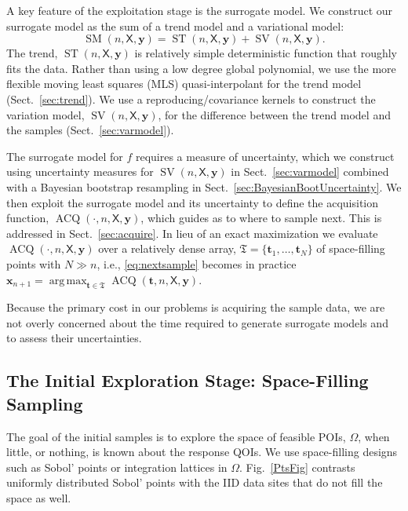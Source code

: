 \documentclass[11pt]{NSFamsart}
\DeclareMathOperator*{\argmax}{arg\,max}
\DeclareMathOperator{\SURR}{SM} %
\DeclareMathOperator{\STREND}{ST} %
\DeclareMathOperator{\SVAR}{SV} %
\DeclareMathOperator{\VAL}{ACQ}
\newcommand{\mX}{\mathsf{X}}
\newcommand{\bx}{{\boldsymbol{x}}}
\newcommand{\by}{{\boldsymbol{y}}}
\newcommand{\bt}{{\boldsymbol{t}}}
\newcommand{\ct}{\mathfrak{T}}
\begin{document}
A key feature of the exploitation stage is the surrogate model. We construct our surrogate model as the sum of a trend model and a variational model: 
\begin{equation*}
\SURR(n,\mX,\by) = \STREND(n,\mX,\by) + \SVAR(n,\mX,\by). 
\end{equation*} 
The trend, $\STREND(n,\mX,\by)$ is relatively simple deterministic function that roughly fits the data. Rather than using a low degree global polynomial, we use the more flexible moving least squares (MLS) quasi-interpolant for the trend model (Sect.\ \ref{sec:trend}). We use a reproducing/covariance kernels to construct the variation model, $\SVAR(n,\mX,\by)$, for the difference between the trend model and the samples (Sect.\ \ref{sec:varmodel}). 

The surrogate model for $f$ requires a measure of uncertainty, which we construct using uncertainty measures for $\SVAR(n,\mX,\by)$ in Sect.\ \ref{sec:varmodel} combined with a Bayesian bootstrap resampling in Sect.\ \ref{sec:BayesianBootUncertainty}. We then exploit the surrogate model and its uncertainty to define the acquisition function, $\VAL(\cdot, n,\mX,\by)$, which guides as to where to sample next. This is addressed in Sect.\ \ref{sec:acquire}. In lieu of an exact maximization we evaluate $\VAL(\cdot, n,\mX,\by)$ over a relatively dense array, $\ct = \{\bt_1, \ldots, \bt_N\}$ of  space-filling points with $N \gg n$, i.e., \eqref{eq:nextsample} becomes in practice $\bx_{n+1} = \argmax_{\bt \in \ct} \VAL(\bt, n,\mX,\by)$.

Because the primary cost in our problems is acquiring the sample data, we are not overly concerned about the time required to generate surrogate models and to assess their uncertainties.


\subsection{The Initial Exploration Stage: Space-Filling Sampling} \label{sec:Explore}

The goal of the initial samples is to explore the space of feasible POIs, $\Omega$, when little, or nothing, is known about the response QOIs. We use space-filling designs such as Sobol' points \cite{DicPil10a} or integration lattices \cite{SloJoe94, DicEtal14a} in $\Omega$.  Fig.\ \ref{PtsFig} contrasts uniformly distributed Sobol' points with the IID data sites that do not fill the space as well.
\end{document}
